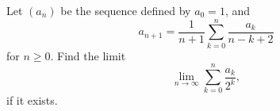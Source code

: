 Let \((a_{n})\) be the sequence defined by \(a_{0}=1\), and \[a_{n+1}=\frac{1}{n+1}\sum_{k=0}^{n}\dfrac{a_k}{n-k+2}\] for \(n \geq 0\).
Find the limit \[\lim_{n \rightarrow \infty} \sum_{k=0}^{n}\dfrac{a_{k}}{2^{k}},\] if it exists.